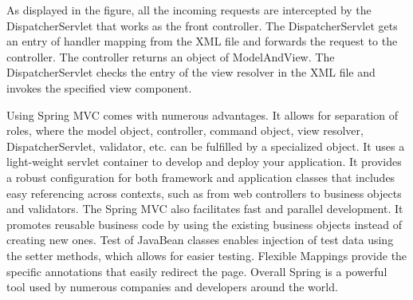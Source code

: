 As displayed in the figure, all the incoming requests are intercepted by the DispatcherServlet that works as the front controller.
The DispatcherServlet gets an entry of handler mapping from the XML file and forwards the request to the controller.
The controller returns an object of ModelAndView.
The DispatcherServlet checks the entry of the view resolver in the XML file and invokes the specified view component.

Using Spring MVC comes with numerous advantages. It allows for separation of roles, where the model object, controller, command object, view resolver, DispatcherServlet, validator, etc. can be fulfilled by a specialized object. It uses a light-weight servlet container to develop and deploy your application.
It provides a robust configuration for both framework and application classes that includes easy referencing across contexts, such as from web controllers to business objects and validators.
The Spring MVC also facilitates fast and parallel development.
It promotes reusable business code by using the existing business objects instead of creating new ones.
Test of JavaBean classes enables injection of test data using the setter methods, which allows for easier testing.
Flexible Mappings provide the specific annotations that easily redirect the page.
Overall Spring is a powerful tool used by numerous companies and developers around the world.



